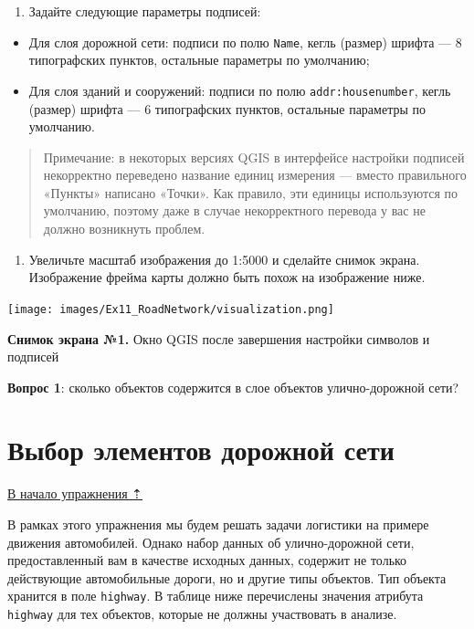 \documentclass[
  12pt,
]{book}
\providecommand{\tightlist}{%
  \setlength{\itemsep}{0pt}\setlength{\parskip}{0pt}}
\begin{document}
\begin{enumerate}
\def\labelenumi{\arabic{enumi}.}
\setcounter{enumi}{5}
\tightlist
\item
  Задайте следующие параметры подписей:
\end{enumerate}

\begin{itemize}
\tightlist
\item
  Для слоя дорожной сети: подписи по полю \texttt{Name}, кегль (размер) шрифта --- 8 типографских пунктов, остальные параметры по умолчанию;
\item
  Для слоя зданий и сооружений: подписи по полю \texttt{addr:housenumber}, кегль (размер) шрифта --- 6 типографских пунктов, остальные параметры по умолчанию.
\end{itemize}

\begin{quote}
Примечание: в некоторых версиях QGIS в интерфейсе настройки подписей некорректно переведено название единиц измерения --- вместо правильного «Пункты» написано «Точки». Как правило, эти единицы используются по умолчанию, поэтому даже в случае некорректного перевода у вас не должно возникнуть проблем.
\end{quote}

\begin{enumerate}
\def\labelenumi{\arabic{enumi}.}
\setcounter{enumi}{6}
\tightlist
\item
  Увеличьте масштаб изображения до 1:5000 и сделайте снимок экрана. Изображение фрейма карты должно быть похож на изображение ниже.
\end{enumerate}

\texttt{[image: images/Ex11\_RoadNetwork/visualization.png]}

\textbf{Снимок экрана №1.} Окно QGIS после завершения настройки символов и подписей

\textbf{Вопрос 1}: сколько объектов содержится в слое объектов улично-дорожной сети?

\hypertarget{networks-query}{%
\section{Выбор элементов дорожной сети}\label{networks-query}}

\protect\hyperlink{networks}{В начало упражнения ⇡}

В рамках этого упражнения мы будем решать задачи логистики на примере движения автомобилей. Однако набор данных об улично-дорожной сети, предоставленный вам в качестве исходных данных, содержит не только действующие автомобильные дороги, но и другие типы объектов. Тип объекта хранится в поле \texttt{highway}. В таблице ниже перечислены значения атрибута \texttt{highway} для тех объектов, которые не должны участвовать в анализе.
\end{document}
